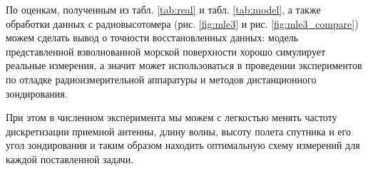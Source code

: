 По оценкам, полученным из табл. \ref{tab:real} и табл. \ref{tab:model}, а также
обработки данных  с радиовысотомера (рис. \ref{fig:mle3} и рис. \ref{fig:mle3_compare})
можем сделать вывод о точности восстановленных данных: модель представленной
взволнованной морской поверхности хорошо симулирует реальные измерения, а
значит может использоваться в проведении экспериментов по отладке
радиоизмерительной аппаратуры и методов дистанционного зондирования. 

При этом в численном эксперимента мы можем с легкостью менять частоту
дискретизации приемной антенны, длину волны, высоту полета спутника и его угол
зондирования и таким образом находить оптимальную схему измерений для каждой
поставленной задачи.
